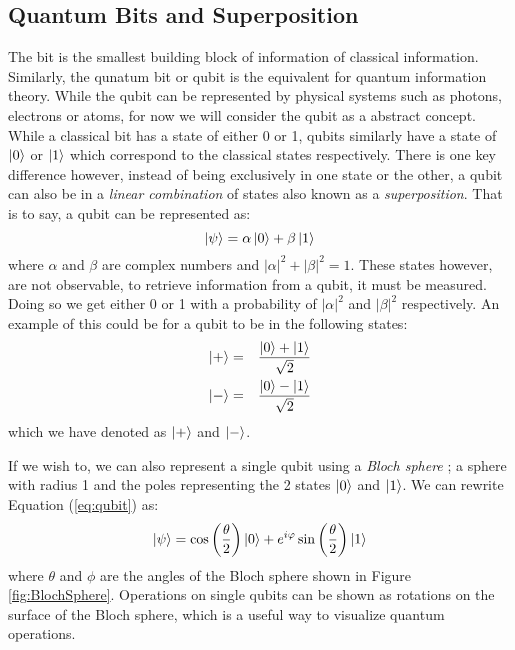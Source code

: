 \documentclass[reqno]{amsart}
\numberwithin{equation}{section}
\numberwithin{figure}{section}
\begin{document}
\subsection{Quantum Bits and Superposition} \label{sec:QubitsandSuperposition}
\begin{justify}
    The bit is the smallest building block of information of classical information. Similarly, the qunatum bit or qubit is the equivalent for quantum information theory. \cite{Aaronson2013} While the qubit can be represented by physical systems such as photons, electrons or atoms, for now we will consider the qubit as a abstract concept. \\

    While a classical bit has a state of either 0 or 1, qubits similarly have a state of $\ket{0}$ or $\ket{1}$ which correspond to the classical states respectively. There is one key difference however, instead of being exclusively in one state or the other, a qubit can also be in a \textit{linear combination} of states also known as a \textit{superposition}. That is to say, a qubit can be represented as:
    \begin{equation}
        \ket{\psi} = \alpha\ket{0} + \beta\ket{1} \label{eq:qubit}
    \end{equation}
where $\alpha$ and $\beta$ are complex numbers and $|\alpha|^{2} + |\beta|^{2} = 1$. These states however, are not observable, to retrieve information from a qubit, it must be measured. Doing so we get either 0 or 1 with a probability of $|\alpha|^{2}$ and $|\beta|^{2}$ respectively. An example of this could be for a qubit to be in the following states:
    \begin{eqnarray}
        \ket{+} &=& \frac{\ket{0} + \ket{1}}{\sqrt{2}} \label{eqn:+} \\
        \ket{-} &=& \frac{\ket{0} - \ket{1}}{\sqrt{2}} \label{eqn:-}
    \end{eqnarray}
which we have denoted as $\ket{+}$ and $\ket{-}$.

If we wish to, we can also represent a single qubit using a \textit{Bloch sphere} \cite{FeynmanRichardVernon1957}; a sphere with radius 1 and the poles representing the 2 states $\ket{0}$ and $\ket{1}$. We can rewrite Equation (\ref{eq:qubit}) as:
    \begin{equation}
        \ket{\psi} = \cos\left(\frac{\theta}{2}\right)\ket{0} + e^{i\varphi}\sin\left(\frac{\theta}{2}\right)\ket{1}
    \end{equation}
where $\theta$ and $\phi$ are the angles of the Bloch sphere shown in Figure \ref{fig:BlochSphere}. Operations on single qubits can be shown as rotations on the surface of the Bloch sphere, which is a useful way to visualize quantum operations. \\
    \begin{figure}[h]
        \centering
        \begin{tikzpicture}


\end{tikzpicture}
\end{figure}
\end{justify}
\end{document}
